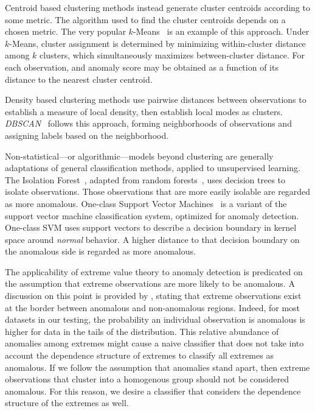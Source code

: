 Centroid based clustering methods instead generate cluster centroids 
    according to some metric.  The algorithm used to find the cluster centroids 
    depends on a chosen metric.  The very popular $k$-Means~\citep{hartigan1979} 
    is an example of this approach. Under $k$-Means, cluster assignment is 
    determined by minimizing within-cluster distance among $k$ clusters, which 
    simultaneously maximizes between-cluster distance. For each observation, 
    and anomaly score may be obtained as a function of its distance to the 
    nearest cluster centroid.  
    
Density based clustering methods use pairwise distances between observations to 
    establish a measure of local density, then establish local modes as 
    clusters.  \emph{DBSCAN}~\citep{ester1996} follows this approach, forming 
    neighborhoods of observations and assigning labels based on the 
    neighborhood. 
    
Non-statistical---or algorithmic---models beyond clustering are generally adaptations 
    of general classification methods, applied to unsupervised learning.  
    The Isolation Forest~\citep{liu2000}, adapted from random 
    forests~\citep{breiman2001}, uses decision trees to isolate observations.
    Those observations that are more easily isolable are regarded as more 
    anomalous.  One-class Support Vector Machines~\citep{chang2011} is a variant
    of the support vector machine classification system, optimized for 
    anomaly detection.  One-class SVM uses support vectors to describe a 
    decision boundary in kernel space around \emph{normal} behavior. A higher 
    distance to that decision boundary on the anomalous side is regarded as 
    more anomalous.

The applicability of extreme value theory to anomaly detection is predicated on 
    the assumption that extreme observations are more likely to be anomalous.  
    A discussion on this point is provided by \cite{goix2017}, stating that 
    extreme observations exist at the border between anomalous and non-anomalous 
    regions.  Indeed, for most datasets in our testing, the probability an 
    individual observation is anomalous is higher for data in the tails of the 
    distribution. This relative abundance of anomalies among extremes might 
    cause a naive classifier that does not take into account the dependence 
    structure of extremes to classify all extremes as anomalous.  If we follow 
    the assumption that anomalies stand apart, then extreme observations that 
    cluster into a homogenous group should not be considered anomalous.  For 
    this reason, we desire a classifier that considers the dependence structure 
    of the extremes as well.
    
